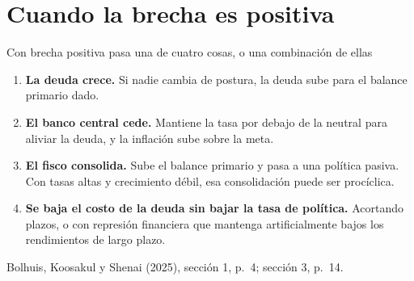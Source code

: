 \documentclass[aspectratio=169,11pt]{beamer}
\newcommand{\fuente}[1]{\par\vfill{\small\color{cGris}#1\par}}
\newcommand{\BKS}{Bolhuis, Koosakul y Shenai (2025)}
\begin{document}
\section{Cuando la brecha es positiva}

\begin{frame}{Con brecha positiva pasa una de cuatro cosas, o una combinación de ellas}
  \begin{enumerate}
    \item<1-> \textbf{La deuda crece.} Si nadie cambia de postura, la deuda sube para el balance primario dado.
    \item<2-> \textbf{El banco central cede.} Mantiene la tasa por debajo de la neutral para aliviar la deuda, y la inflación sube sobre la meta.
    \item<3-> \textbf{El fisco consolida.} Sube el balance primario y pasa a una política pasiva. Con tasas altas y crecimiento débil, esa consolidación puede ser procíclica.
    \item<4-> \textbf{Se baja el costo de la deuda sin bajar la tasa de política.} Acortando plazos, o con represión financiera que mantenga artificialmente bajos los rendimientos de largo plazo.
  \end{enumerate}
  \fuente{\BKS, sección 1, p.~4; sección 3, p.~14.}
\end{frame}
\end{document}
